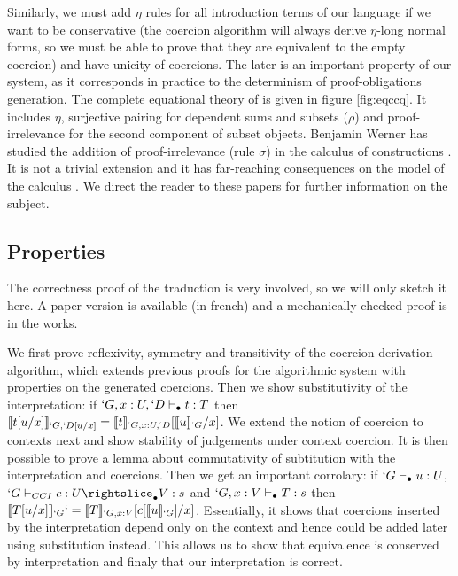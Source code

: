 \documentclass{llncs}
\begin{document}
Similarly, we must add $\eta$ rules for all introduction terms of our
language if we want to be conservative (the coercion algorithm will
always derive $\eta$-long normal forms, so we must be able to prove that they
are equivalent to the empty coercion) and have unicity of
coercions. The later is an important property of our system, as it
corresponds in practice to the determinism of proof-obligations
generation. The complete equational theory of \CICq{} is given in figure
\vref{fig:eqccq}. It includes $\eta$, surjective pairing for dependent
sums and subsets ($\rho$) and proof-irrelevance for the second component
of subset objects.
Benjamin Werner has studied the addition of proof-irrelevance (rule
$\sigma$) in the calculus of constructions
\cite{Werner:ProofIrrelevance}. It is not a trivial extension and it has
far-reaching consequences on the model of the calculus
\cite{DBLP:conf/types/MiquelW02}. We direct the reader to these papers for further
information on the subject.


\subsection{Properties}
The correctness proof of the traduction is very involved, so we will
only sketch it here. A paper version \cite{sozeau:Coq/Russell/report} is
available (in french) and a mechanically checked proof is in the works.


We first prove reflexivity, symmetry and transitivity of the coercion
derivation algorithm, which extends previous proofs for the algorithmic
system with properties on
the generated coercions. Then we show substitutivity of the
interpretation: if $`G, x : U, `D \vdash_{\bullet} t : T$ then $\llbracket t[u/x] \rrbracket_{`G,
 `D[u/x]} = \llbracket t \rrbracket_{`G, x : U, `D}[\llbracket u \rrbracket_{`G}/x]$. We extend the notion
of coercion to contexts next and show stability of judgements under
context coercion. It is then possible to prove a lemma about commutativity of
subtitution with the interpretation and coercions. Then we get an
important corrolary: if $`G \vdash_{\bullet} u : U$, $\subimpl{`G}{c}{U}{V}{s}$ and
$`G, x : V \vdash_{\bullet} T : s$ then $\llbracket T[u/x] \rrbracket_{`G} `= \llbracket T \rrbracket_{`G, x :
  V}[c[\llbracket u \rrbracket_{`G}]/x]$. Essentially, it shows that coercions inserted
by the interpretation depend only on the context and hence could be
added later using substitution instead. This allows us to show that
equivalence is conserved by interpretation and finaly that our
interpretation is correct.
\end{document}
